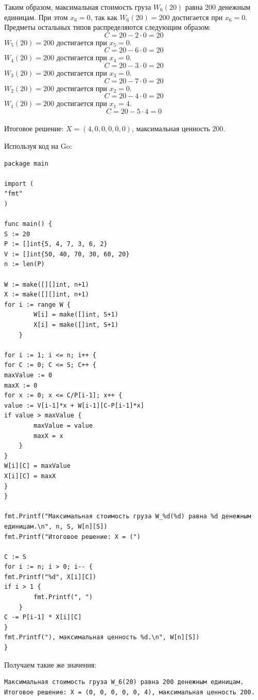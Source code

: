 \documentclass{article}
\begin{document}
Таким образом, максимальная стоимость груза $W_6(20)$ равна 200 денежным единицам.
При этом $x_6 = 0$, так как $W_6(20) = 200$ достигается при $x_6=0$.
Предметы остальных типов распределяются следующим образом:
\[
    C = 20 - 2 \cdot 0 = 20
\]
$W_5(20) = 200$ достигается при $x_5 = 0$.
\[
    C = 20 - 6 \cdot 0 = 20
\]
$W_4(20) = 200$ достигается при $x_4 = 0$.
\[
    C = 20 - 3 \cdot 0 = 20
\]
$W_3(20) = 200$ достигается при $x_3 = 0$.
\[
    C = 20 - 7 \cdot 0 = 20
\]
$W_2(20) = 200$ достигается при $x_2 = 0$.
\[
    C = 20 - 4 \cdot 0 = 20
\]
$W_1(20) = 200$ достигается при $x_1 = 4$.
\[
    C = 20 - 5 \cdot 4 = 0
\]\\
Итоговое решение: $X = (4, 0, 0, 0, 0, 0)$, максимальная ценность $200$.

Используя код на Go:

\begin{verbatim}
package main

import (
"fmt"
)

func main() {
S := 20
P := []int{5, 4, 7, 3, 6, 2}
V := []int{50, 40, 70, 30, 60, 20}
n := len(P)

W := make([][]int, n+1)
X := make([][]int, n+1)
for i := range W {
        W[i] = make([]int, S+1)
        X[i] = make([]int, S+1)
    }

for i := 1; i <= n; i++ {
for C := 0; C <= S; C++ {
maxValue := 0
maxX := 0
for x := 0; x <= C/P[i-1]; x++ {
value := V[i-1]*x + W[i-1][C-P[i-1]*x]
if value > maxValue {
        maxValue = value
        maxX = x
    }
}
W[i][C] = maxValue
X[i][C] = maxX
}
}

fmt.Printf("Максимальная стоимость груза W_%d(%d) равна %d денежным единицам.\n", n, S, W[n][S])
fmt.Printf("Итоговое решение: X = (")

C := S
for i := n; i > 0; i-- {
fmt.Printf("%d", X[i][C])
if i > 1 {
        fmt.Printf(", ")
    }
C -= P[i-1] * X[i][C]
}
fmt.Printf("), максимальная ценность %d.\n", W[n][S])
}
\end{verbatim}

Получаем такие же значения:
\begin{verbatim}
Максимальная стоимость груза W_6(20) равна 200 денежным единицам.
Итоговое решение: X = (0, 0, 0, 0, 0, 4), максимальная ценность 200.
\end{verbatim}

\end{document}
